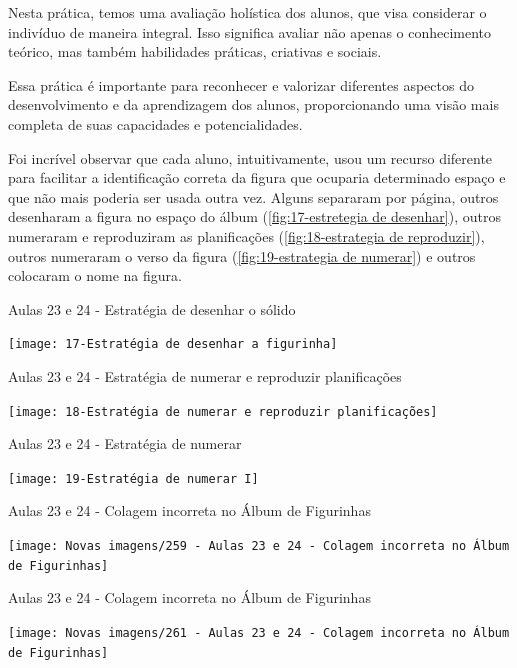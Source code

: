Nesta prática, temos uma avaliação holística dos alunos, que visa considerar o indivíduo de maneira integral. Isso significa avaliar não apenas o conhecimento teórico, mas também habilidades práticas, criativas e sociais.

Essa prática é importante para reconhecer e valorizar diferentes aspectos do desenvolvimento e da aprendizagem dos alunos, proporcionando uma visão mais completa de suas capacidades e potencialidades.

Foi incrível observar que cada aluno, intuitivamente, usou um recurso diferente para facilitar a identificação correta da figura que ocuparia determinado espaço e que não mais poderia ser usada outra vez. Alguns separaram por página, outros desenharam a figura no espaço do álbum (\autoref{fig:17-estretegia de desenhar}), outros numeraram e reproduziram as planificações (\autoref{fig:18-estrategia de reproduzir}), outros numeraram o verso da figura (\autoref{fig:19-estrategia de numerar}) e outros colocaram o nome na figura.

\begin{CenteredFigure}
    \caption{Aulas 23 e 24 - Estratégia de desenhar o sólido} \label{fig:17-estretegia de desenhar}
    \texttt{[image: 17-Estratégia de desenhar a figurinha]}
    \legend{\autoria}
\end{CenteredFigure}

\begin{CenteredFigure}
    \caption{Aulas 23 e 24 - Estratégia de numerar e reproduzir planificações} \label{fig:18-estrategia de reproduzir}
    \texttt{[image: 18-Estratégia de numerar e reproduzir planificações]}
    \legend{\autoria}
\end{CenteredFigure}

\begin{CenteredFigure}
    \caption{Aulas 23 e 24 - Estratégia de numerar} \label{fig:19-estrategia de numerar}
    \texttt{[image: 19-Estratégia de numerar I]}
    \legend{\autoria}
\end{CenteredFigure}

\begin{CenteredFigure}
    \caption{Aulas 23 e 24 - Colagem incorreta no Álbum de Figurinhas} \label{fig: 259 - Aulas 23 e 24 - Colagem incorreta no Album de Figurinhas}
    \texttt{[image: Novas imagens/259 - Aulas 23 e 24 - Colagem incorreta no Álbum de Figurinhas]}
    \legend{\autoria}
\end{CenteredFigure}

\begin{CenteredFigure}
    \caption{Aulas 23 e 24 - Colagem incorreta no Álbum de Figurinhas} \label{fig: 261 - Aulas 23 e 24 - Colagem incorreta no Album de Figurinhas}
    \texttt{[image: Novas imagens/261 - Aulas 23 e 24 - Colagem incorreta no Álbum de Figurinhas]}
    \legend{\autoria}
\end{CenteredFigure}

